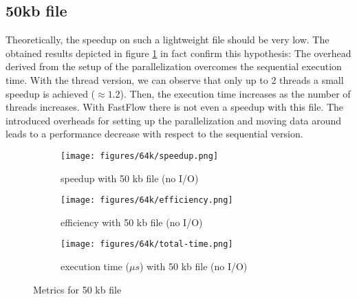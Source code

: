 \documentclass{article}
\begin{document}
\subsection{50kb file}
Theoretically, the speedup on such a lightweight file should be very low.
The obtained results depicted in figure \ref{fig:50kb} in fact confirm this hypothesis: The overhead derived
from the setup of the parallelization overcomes the sequential execution time.
With the thread version, we can observe that only up to 2 threads a small speedup is achieved ($\approx 1.2$).
Then, the execution time increases as the number of threads increases.
With FastFlow there is not even a speedup with this file. The introduced overheads
for setting up the parallelization and moving data around leads to a performance decrease
with respect to the sequential version.
\begin{figure}[H]
    \begin{subfigure}{0.6\textwidth}
        \centering
        \texttt{[image: figures/64k/speedup.png]}
        \caption{speedup with 50 kb file (no I/O)}
    \end{subfigure}
    \begin{subfigure}{0.6\textwidth}
        \centering
        \texttt{[image: figures/64k/efficiency.png]}
        \caption{efficiency with 50 kb file (no I/O)}
    \end{subfigure}
    \begin{subfigure}{0.6\textwidth}
        \centering
        \texttt{[image: figures/64k/total-time.png]}
        \caption{execution time ($\mu s$) with 50 kb file (no I/O)}
    \end{subfigure}
    \caption{Metrics for 50 kb file}
    \label{fig:50kb}
\end{figure}
\end{document}
